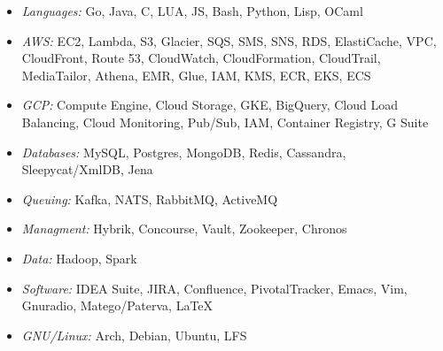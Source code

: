 \documentclass[12t]{article}
\begin{document}
\vspace{5pt}\begin{multicols}{2}
  \begin{small}
    \begin{itemize}[leftmargin=*,label=]
    \item\begin{minipage}[t]{\linewidth}{\textit{Languages:} Go, Java, C, LUA, JS, Bash, Python, Lisp, OCaml}\end{minipage}
    \item\begin{minipage}[t]{\linewidth}{\textit{AWS:} EC2, Lambda, S3, Glacier, SQS, SMS, SNS, RDS, ElastiCache, VPC, CloudFront,
      Route 53, CloudWatch, CloudFormation, CloudTrail, MediaTailor, Athena, EMR, Glue, IAM, KMS, ECR, EKS, ECS}\end{minipage}
    \item\begin{minipage}[t]{\linewidth}{\textit{GCP:} Compute Engine, Cloud Storage, GKE, BigQuery, Cloud Load Balancing,
      Cloud Monitoring, Pub/Sub, IAM, Container Registry, G Suite}\end{minipage}
    \item\begin{minipage}[t]{\linewidth}{\textit{Databases:} MySQL, Postgres, MongoDB, Redis, Cassandra, Sleepycat/XmlDB, Jena}\end{minipage}
    \item\begin{minipage}[t]{\linewidth}{\textit{Queuing:} Kafka, NATS, RabbitMQ, ActiveMQ}\end{minipage}
    \item\begin{minipage}[t]{\linewidth}{\textit{Managment:} Hybrik, Concourse, Vault, Zookeeper, Chronos}\end{minipage}
    \item\begin{minipage}[t]{\linewidth}{\textit{Data:} Hadoop, Spark}\end{minipage}
    \item\begin{minipage}[t]{\linewidth}{\textit{Software:} IDEA Suite, JIRA, Confluence, PivotalTracker,
      Emacs, Vim, Gnuradio, Matego/Paterva, \LaTeX}\end{minipage}
    \item\begin{minipage}[t]{\linewidth}{\textit{GNU/Linux:} Arch, Debian, Ubuntu, LFS}\end{minipage}
    \end{itemize}
  \end{small} 
\end{multicols}
\end{document}
